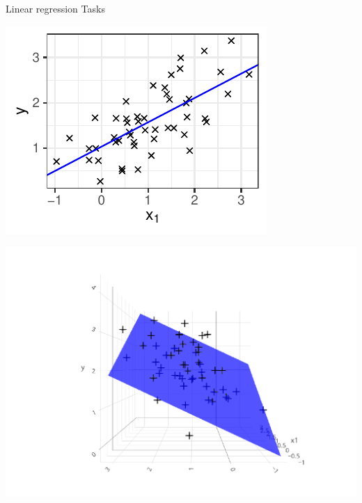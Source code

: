 \documentclass[11pt,compress,t,notes=noshow, xcolor=table]{beamer}
\begin{document}
\begin{vbframe}{Linear regression Tasks}
\begin{itemize}
\end{itemize}
\vfill
\begin{minipage}{0.4\textwidth}
    \includegraphics[width=\textwidth]{figure/reg_l2_basic_lm.pdf} 
\end{minipage}
\hspace{1cm}
\begin{minipage}{0.4\textwidth}
    \includegraphics[width=1.2\textwidth, trim=100 0 0 20, clip]{
    figure/reg_l2_basic_lm_biv.pdf} 
\end{minipage}

\end{vbframe} 

\end{document}
